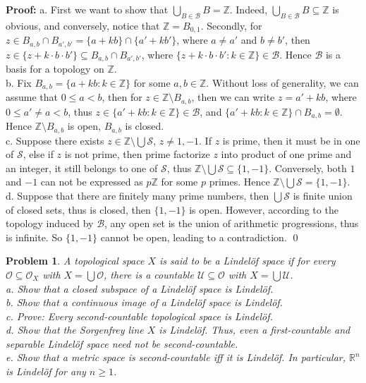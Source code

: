 \documentclass[12pt]{article}
\newtheorem{problem}{Problem}
\begin{document}
\textbf{Proof:} a. First we want to show that $\bigcup_{B\in\mathcal{B}}B=\mathbb{Z}$. Indeed, $\bigcup_{B\in\mathcal{B}}B\subseteq\mathbb{Z}$ is obvious, and conversely, notice that $\mathbb{Z}=B_{0, 1}$. Secondly, for $z\in B_{a,b}\cap B_{a',b'}=\{a+kb\}\cap\{a'+kb'\}$, where $a\neq a'$ and $b\neq b'$, then $z\in \{z+k\cdot b\cdot b'\}\subseteq B_{a,b}\cap B_{a',b'}$, where $\{z+k\cdot b\cdot b': k\in \mathbb{Z}\}\in\mathcal{B}$. Hence $\mathcal{B}$ is a basis for a topology on $\mathbb{Z}$. \\
\indent b. Fix $B_{a,b}=\{a+kb: k\in\mathbb{Z}\}$ for some $a,b\in\mathbb{Z}$. Without loss of generality, we can assume that $0\leq a< b$, then for $z\in\mathbb{Z}\setminus B_{a,b}$, then we can write $z=a'+kb$, where $0\leq a'\neq a<b$, thus $z\in \{a'+kb: k\in\mathbb{Z}\}\in\mathcal{B}$, and $\{a'+kb:k\in\mathbb{Z}\}\cap B_{a,b}=\emptyset$. Hence $\mathbb{Z}\setminus B_{a,b}$ is open, $B_{a,b}$ is closed. \\
\indent c. Suppose there exists $z\in\mathbb{Z}\setminus\bigcup\mathcal{S}$, $z\neq 1,-1$. If $z$ is prime, then it must be in one of $\mathcal{S}$, else if $z$ is not prime, then prime factorize $z$ into product of one prime and an integer, it still belongs to one of $\mathcal{S}$, thus $\mathbb{Z}\setminus\bigcup\mathcal{S}\subseteq \{1,-1\}$. Conversely, both $1$ and $-1$ can not be expressed as $p\mathbb{Z}$ for some $p$ primes. Hence $\mathbb{Z}\setminus\bigcup\mathcal{S}=\{1,-1\}$. \\
\indent d. Suppose that there are finitely many prime numbers, then $\bigcup\mathcal{S}$ is finite union of closed sets, thus is closed, then $\{1,-1\}$ is open. However, according to the topology induced by $\mathcal{B}$, any open set is the union of arithmetic progressions, thus is infinite. So $\{1,-1\}$ cannot be open, leading to a contradiction. \qed
\\
\begin{problem}
A topological space $X$ is said to be a Lindelöf space if for every $\mathcal{O}\subseteq\mathcal{O}_{X}$ with $X=\bigcup\mathcal{O}$, there is a countable $\mathcal{U}\subseteq\mathcal{O}$ with $X=\bigcup\mathcal{U}$. \\
\indent a. Show that a closed subspace of a Lindelöf space is Lindelöf. \\
\indent b. Show that a continuous image of a Lindelöf space is Lindelöf. \\
\indent c. Prove: Every second-countable topological space is Lindelöf. \\
\indent d. Show that the Sorgenfrey line $X$ is Lindelöf. Thus, even a first-countable and separable Lindelöf space need not be second-countable. \\
\indent e. Show that a metric space is second-countable iff it is Lindelöf. In particular, $\mathbb{R}^{n}$ is Lindelöf for any $n\geq 1$.
\end{problem}
\end{document}
